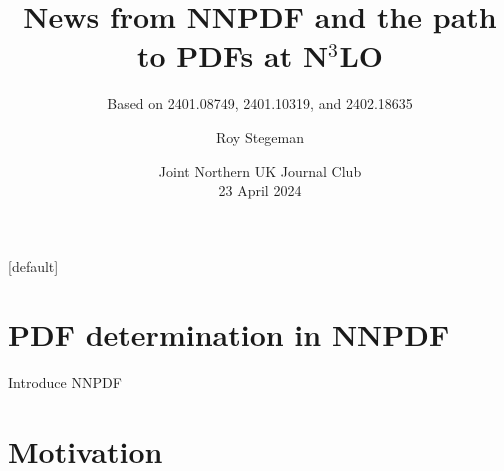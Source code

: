 \documentclass[aspectratio=169, 8pt,t]{beamer}
\title{News from NNPDF and the path to PDFs at N$^3$LO}
\subtitle{Based on 2401.08749, 2401.10319, and 2402.18635 }
\date{Joint Northern UK Journal Club  \\[0.1cm] 23 April 2024}
\author{Roy Stegeman}
\institute{\small The University of Edinburgh}
\begin{document}
{
\begin{frame}
  \titlepage
\end{frame}
}

[default]



\newcommand{\nn}{\vspace*{1em}}

\section*{PDF determination in NNPDF}

\begin{frame}{Introduce NNPDF}
\end{frame}



\section*{Motivation}
\end{document}
